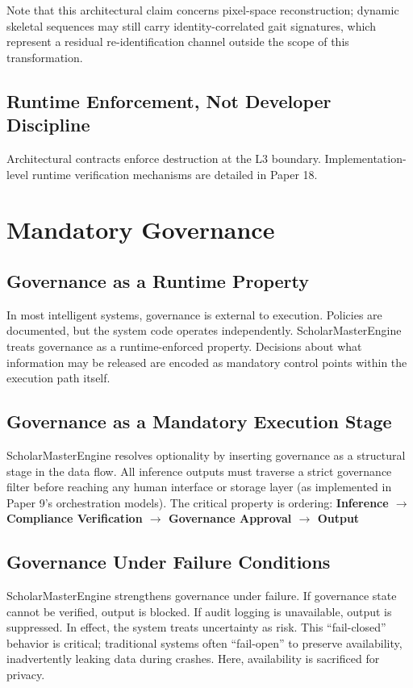 \documentclass[conference]{IEEEtran}
\begin{document}
Note that this architectural claim concerns pixel-space reconstruction; dynamic skeletal sequences may still carry identity-correlated gait signatures, which represent a residual re-identification channel outside the scope of this transformation.

\subsection{Runtime Enforcement, Not Developer Discipline}
Architectural contracts enforce destruction at the L3 boundary. Implementation-level runtime verification mechanisms are detailed in Paper 18.

\section{Mandatory Governance}

\subsection{Governance as a Runtime Property}
In most intelligent systems, governance is external to execution. Policies are documented, but the system code operates independently. ScholarMasterEngine treats governance as a runtime-enforced property. Decisions about what information may be released are encoded as mandatory control points within the execution path itself.

\subsection{Governance as a Mandatory Execution Stage}
ScholarMasterEngine resolves optionality by inserting governance as a structural stage in the data flow. All inference outputs must traverse a strict governance filter before reaching any human interface or storage layer (as implemented in Paper 9's orchestration models). The critical property is ordering:
\textbf{Inference $\rightarrow$ Compliance Verification $\rightarrow$ Governance Approval $\rightarrow$ Output}

\subsection{Governance Under Failure Conditions}
ScholarMasterEngine strengthens governance under failure. If governance state cannot be verified, output is blocked. If audit logging is unavailable, output is suppressed. In effect, the system treats uncertainty as risk. This ``fail-closed'' behavior is critical; traditional systems often ``fail-open'' to preserve availability, inadvertently leaking data during crashes. Here, availability is sacrificed for privacy.
\end{document}
